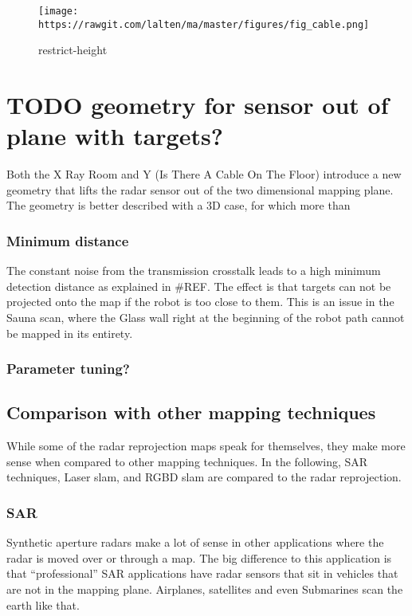 \begin{figure}
\centering
\texttt{[image: https://rawgit.com/lalten/ma/master/figures/fig\_cable.png]}
\caption{restrict-height}
\end{figure}

\section{TODO geometry for sensor out of plane with
targets?}\label{todo-geometry-for-sensor-out-of-plane-with-targets}

Both the X Ray Room and Y (Is There A Cable On The Floor) introduce a
new geometry that lifts the radar sensor out of the two dimensional
mapping plane. The geometry is better described with a 3D case, for
which more than

\subsubsection{Minimum distance}\label{minimum-distance}

The constant noise from the transmission crosstalk leads to a high
minimum detection distance as explained in \#REF. The effect is that
targets can not be projected onto the map if the robot is too close to
them. This is an issue in the Sauna scan, where the Glass wall right at
the beginning of the robot path cannot be mapped in its entirety.

\subsubsection{Parameter tuning?}\label{parameter-tuning}

\subsection{Comparison with other mapping
techniques}\label{comparison-with-other-mapping-techniques}

While some of the radar reprojection maps speak for themselves, they
make more sense when compared to other mapping techniques. In the
following, SAR techniques, Laser slam, and RGBD slam are compared to the
radar reprojection.

\subsubsection{SAR}\label{sar-1}

Synthetic aperture radars make a lot of sense in other applications
where the radar is moved over or through a map. The big difference to
this application is that ``professional'' SAR applications have radar
sensors that sit in vehicles that are not in the mapping plane.
Airplanes, satellites and even Submarines scan the earth like that.

